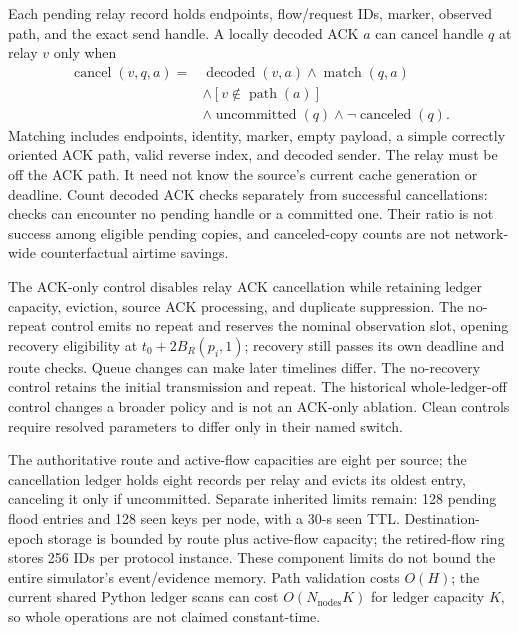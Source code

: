 Each pending relay record holds endpoints, flow/request IDs, marker,
observed path, and the exact send handle. A locally decoded ACK $a$ can
cancel handle $q$ at relay $v$ only when
\begin{equation}
\begin{aligned}
\operatorname{cancel}(v,q,a)={}&\operatorname{decoded}(v,a)
\land\operatorname{match}(q,a)\\
&\land[v\notin\operatorname{path}(a)]\\
&\land\operatorname{uncommitted}(q)
\land\neg\operatorname{canceled}(q).
\end{aligned}
\label{eq:cancel}
\end{equation}
Matching includes endpoints, identity, marker, empty payload, a simple
correctly oriented ACK path, valid reverse index, and decoded sender.
The relay must be off the ACK path. It need not know the source's current
cache generation or deadline. Count decoded ACK checks separately from
successful cancellations: checks can encounter no pending handle or a
committed one. Their ratio is not success among eligible pending copies,
and canceled-copy counts are not network-wide counterfactual airtime savings.

The ACK-only control disables relay ACK cancellation while retaining ledger
capacity, eviction, source ACK processing, and duplicate suppression. The
no-repeat control emits no repeat and reserves the nominal observation slot,
opening recovery eligibility at $t_0+2B_R(p_i,1)$; recovery still passes its
own deadline and route checks. Queue changes can make later timelines
differ. The no-recovery control retains the initial transmission and repeat.
The historical whole-ledger-off control changes a broader policy and is
not an ACK-only ablation. Clean controls require resolved parameters to
differ only in their named switch.

The authoritative route and active-flow capacities are eight per source;
the cancellation ledger holds eight records per relay and evicts its oldest
entry, canceling it only if uncommitted. Separate inherited limits remain:
128 pending flood entries and 128 seen keys per node, with a 30-s seen TTL.
Destination-epoch storage is bounded by route plus active-flow capacity;
the retired-flow ring stores 256 IDs per protocol instance. These component
limits do not bound the entire simulator's event/evidence memory. Path
validation costs $O(H)$; the current shared Python ledger scans can cost
$O(N_{\mathrm{nodes}}K)$ for ledger capacity $K$, so whole operations are
not claimed constant-time.
